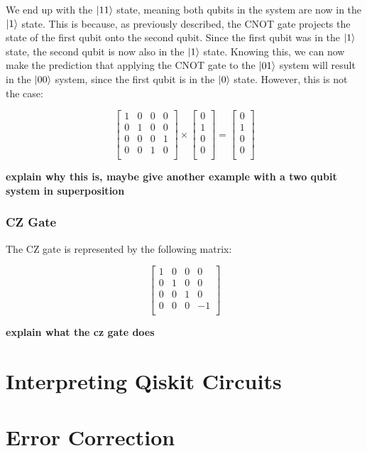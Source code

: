 \documentclass{article}
\begin{document}
We end up with the $\ket{11}$ state, meaning both qubits in the system are now in the $\ket{1}$ state. This is because, as previously described, the CNOT gate projects the state
of the first qubit onto the second qubit. Since the first qubit was in the $\ket{1}$ state, the second qubit is now also in the $\ket{1}$ state. Knowing this, we can now make 
the prediction that applying the CNOT gate to the $\ket{01}$ system will result in the $\ket{00}$ system, since the first qubit is in the $\ket{0}$ state. However, this is not
the case:

\begin{center}
	\[
		\begin{bmatrix}
			1 & 0 & 0 & 0 \\
			0 & 1 & 0 & 0 \\
			0 & 0 & 0 & 1 \\
			0 & 0 & 1 & 0 \\
		\end{bmatrix}
		\times
		\begin{bmatrix}
			0 \\
			1 \\
			0 \\
			0 \\
		\end{bmatrix}
		=
		\begin{bmatrix}
			0 \\
			1 \\
			0 \\
			0 \\
		\end{bmatrix}
	\]
\end{center}

\textbf{explain why this is, maybe give another example with a two qubit system in superposition}

\subsubsection{CZ Gate}
\label{sec:czgate}

The CZ gate is represented by the following matrix:

\begin{center}
	\[
		\begin{bmatrix}
			1 & 0 & 0 & 0 \\
			0 & 1 & 0 & 0 \\
			0 & 0 & 1 & 0 \\
			0 & 0 & 0 & -1 \\
		\end{bmatrix}
	\]
\end{center}

\textbf{explain what the cz gate does}

\section{Interpreting Qiskit Circuits}

\section{Error Correction}
\end{document}
